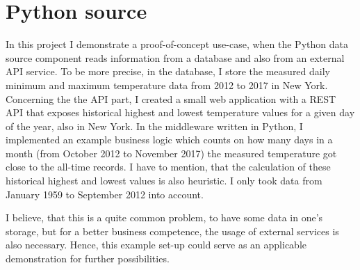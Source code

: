 \section{Python source} \label{case-study-python-source}

In this project I demonstrate a proof-of-concept use-case, when the Python data source component reads information from a database and also from an external API service. To be more precise, in the database, I store the measured daily minimum and maximum temperature data from 2012 to 2017 in New York. Concerning the the API part, I created a small web application with a REST API that exposes historical highest and lowest temperature values for a given day of the year, also in New York. In the middleware written in Python, I implemented an example business logic which counts on how many days in a month (from October 2012 to November 2017) the measured temperature got close to the all-time records. I have to mention, that the calculation of these historical highest and lowest values is also heuristic. I only took data from January 1959 to September 2012 into account.

I believe, that this is a quite common problem, to have some data in one's storage, but for a better business competence, the usage of external services is also necessary. Hence, this example set-up could serve as an applicable demonstration for further possibilities.
